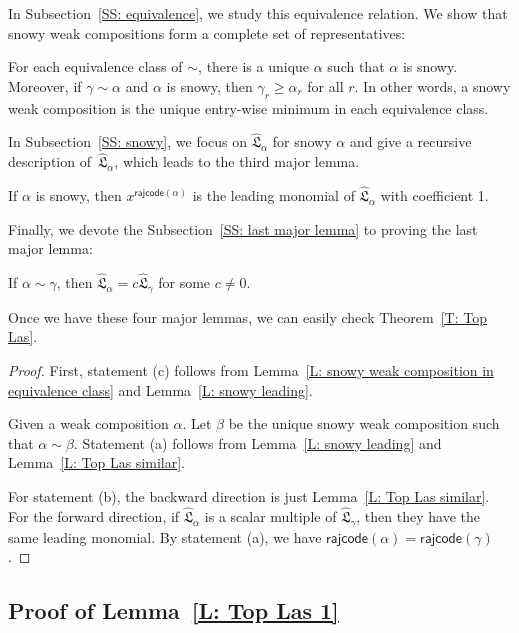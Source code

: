 \documentclass[ALCO]{cedram}
\newcommand{\fL}{\mathfrak{L}}
\newcommand{\topLas}{\widehat{\fL}}
\newcommand{\rajcode}{\mathsf{rajcode}}
\begin{document}
In Subsection~\ref{SS: equivalence},
we study this equivalence relation.
We show that snowy weak compositions form a complete set of representatives:

\begin{lemma}
\label{L: snowy weak composition in equivalence class}
For each equivalence class of $\sim$, 
there is a unique $\alpha$ such that $\alpha$ is snowy. 
Moreover, if $\gamma \sim \alpha$ and $\alpha$ is snowy, 
then $\gamma_r \geqslant \alpha_r$ for all $r$.
In other words, a snowy weak composition is the
unique entry-wise minimum in each equivalence class. 
\end{lemma}


In Subsection~\ref{SS: snowy}, 
we focus on $\topLas_\alpha$ for snowy $\alpha$ and give a recursive description of~$\topLas_\alpha$,
which leads to the third major lemma.

\begin{lemma}
\label{L: snowy leading}
If $\alpha$ is snowy, 
then $x^{\rajcode(\alpha)}$ is the leading monomial of 
$\topLas_\alpha$ with coefficient 1.
\end{lemma}
Finally, we devote the Subsection~\ref{SS: last major lemma} to proving the last
major lemma:

\begin{lemma}
\label{L: Top Las similar}
If $\alpha \sim \gamma$, 
then $\topLas_\alpha = c\topLas_\gamma$ for some $c \neq 0$.
\end{lemma}

Once we have these four major lemmas, 
we can easily check Theorem~\ref{T: Top Las}.


\begin{proof}
First, statement (c) follows from Lemma~\ref{L: snowy weak composition in equivalence class} and Lemma~\ref{L: snowy leading}. 

Given a weak composition $\alpha$. Let $\beta$ be the unique snowy weak composition such that $\alpha \sim \beta$. Statement (a) follows from  Lemma~\ref{L: snowy leading} and Lemma~\ref{L: Top Las similar}.

For statement (b), the backward direction is just Lemma~\ref{L: Top Las similar}.
For the forward direction, 
if $\topLas_\alpha$ is a scalar multiple of $\topLas_\gamma$,
then they have the same leading monomial.
By statement (a), we have $\rajcode(\alpha) = \rajcode(\gamma)$.
\end{proof}


\subsection{Proof of Lemma~\ref{L: Top Las 1}}
\label{SS: Top Las: Exist}
\end{document}
